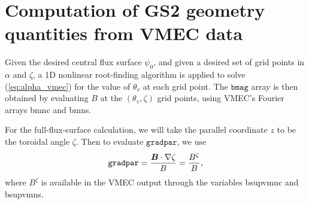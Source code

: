 \documentclass[11pt,letter]{article}
\newcommand{\vect}[1]{\mbox{\boldmath $#1$}}
\newcommand{\bmag}{\mathtt{bmag}}
\newcommand{\gradpar}{\mathtt{gradpar}}
\begin{document}
\section{Computation of GS2 geometry quantities from VMEC data} 


Given the desired central flux surface $\psi_0$, and given a desired set of grid points in $\alpha$ and $\zeta$, 
a 1D nonlinear root-finding algorithm is applied to solve (\ref{eq:alpha_vmec}) for the 
value of $\theta_v$ at each grid point. The $\bmag$ array is then obtained by evaluating $B$
at the $(\theta_v, \zeta)$ grid points, using VMEC's Fourier arrays {\ttfamily bmnc} and {\ttfamily bmns}.

For the full-flux-surface calculation, we will take the parallel coordinate $z$ to be the toroidal angle $\zeta$.
Then to evaluate $\gradpar$, we use
\begin{equation}
\gradpar = \frac{\vect{B}\cdot\nabla\zeta}{B} = \frac{B^\zeta}{B},
\end{equation}
where $B^\zeta$ is available in the VMEC output through the variables {\ttfamily bsupvmnc} and {\ttfamily bsupvmns}.
\end{document}
